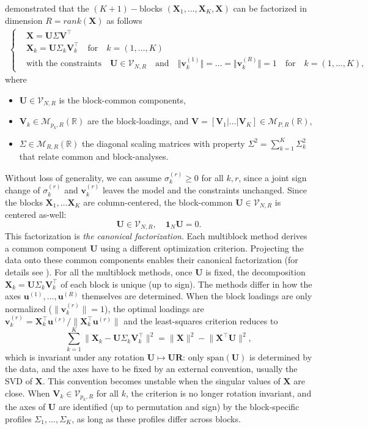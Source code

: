 \documentclass[11pt]{article}
\newcommand{\X}{\mathbf{X}}
\newcommand{\U}{\mathbf{U}}
\newcommand{\V}{\mathbf{V}}
\newcommand{\uu}{\mathbf{u}}
\newcommand{\vv}{\mathbf{v}}
\newcommand{\Stiefel}[2]{\mathcal V_{#1,#2}}
\begin{document}
\cite{bougeard2024} demonstrated that the $(K+1)-$blocks $(\textbf{X}_1,\ldots,\textbf{X}_K,\textbf{X})$ can be factorized in dimension $R=rank(\textbf{X})$ as follows  
\begin{align}
  \left\{
	\begin{array}{ll}
		&\X   = \U \Sigma \V^\intercal   \\
		&\X_k = \U \Sigma_k \V_k^\intercal \quad \textrm{for} \quad k=(1, \dots, K)    \\	
		&\textrm{with the constraints} \quad \U\in \Stiefel{N}{R} \quad \textrm{and} \quad \Vert\vv_k^{(1)}\Vert=\ldots=\Vert\vv_k^{(R)}\Vert=1 \quad \textrm{for} \quad k=(1, \dots, K), 
	\end{array}
	\right. \label{Cano_Facto}
\end{align}
where
\begin{itemize}
	\item $\U\in \Stiefel{N}{R}$ is the block-common components,
	\item $\V_k \in \mathcal M_{p_k,R}(\mathbb R)$ are the  block-loadings, and $\V=[\V_1|...|\V_K] \in \mathcal M_{P,R}(\mathbb R)$,
  \item $\Sigma\in \mathcal M_{R,R}(\mathbb R)$ the diagonal scaling matrices with property $\Sigma^2 = \sum_{k=1}^K \Sigma_k^2$ that relate common and block-analyses.
\end{itemize}
Without loss of generality, we can assume $\sigma_k^{(r)}\geq 0$ for all $k,r$, since a joint sign change of $\sigma_k^{(r)}$ and $\vv_k^{(r)}$ leaves the model and the constraints unchanged. Since the blocks $\X_1,...\X_K$ are column-centered, the block-common $\U\in\Stiefel{N}{R}$ is centered as-well:
\[\U\in\Stiefel{N}{R}, \quad \mathbf{1}_N\U=0.\]
This factorization is \textit{the canonical factorization}. Each multiblock method derives a common component $\U$ using a different optimization criterion. Projecting the data onto these common components enables their canonical factorization (for details see \cite{bougeard2024}). For all the multiblock methods, once $\U$ is fixed, the decomposition $\X_k=\U\Sigma_k\V_k^\intercal$ of each block is unique (up to sign). The methods differ in how the axes $\uu^{(1)},\ldots,\uu^{(R)}$ themselves are determined. When the block loadings are only normalized ($\|\vv_k^{(r)}\|=1$), the optimal loadings are
$\vv_k^{(r)}=\X_k^\intercal\uu^{(r)}/\|\X_k^\intercal\uu^{(r)}\|$ and the least-squares criterion reduces to
\[
  \sum_{k=1}^K\bigl\|\X_k-\U\Sigma_k\V_k^\intercal\bigr\|^2=\|\X\|^2-\bigl\|\X^\intercal\U\bigr\|^2 ,
\]
which is invariant under any rotation $\U\mapsto\U\mathbf R$: only $\mathrm{span}(\U)$ is determined by the data, and the axes have to be fixed by an external convention, usually the SVD of $\X$. This convention becomes unstable when the singular values of $\X$ are close. When $\V_k\in\Stiefel{p_k}{R}$ for all $k$, the criterion is no longer rotation invariant, and the axes of $\U$ are identified (up to permutation and sign) by the block-specific profiles $\Sigma_1,\ldots,\Sigma_K$, as long as these profiles differ across blocks. 
 
\end{document}
